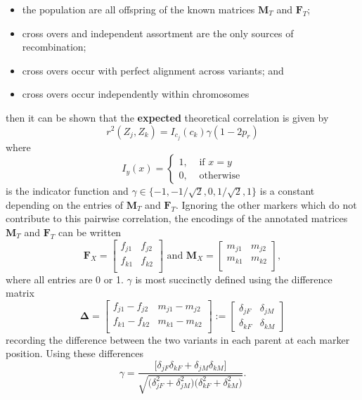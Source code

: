 \documentclass{article}
\newcommand{\m}[1]{\mathbf{#1}}               %
\newcommand{\sm}[1]{\boldsymbol{#1}}   %
\newcommand{\ind}[2]{I_{#2} \left( #1 \right)}
\newcommand{\corr}{r^2}
\begin{document}
\begin{itemize}
\item the population are all offspring of the known matrices $\m{M}_T$ and $\m{F}_T$;
\item cross overs and independent assortment are the only sources of recombination;
\item cross overs occur with perfect alignment across variants; and
\item cross overs occur independently within chromosomes
\end{itemize}
then it can be shown that the \textbf{expected} theoretical correlation is given by
\begin{equation} \label{eq:prGenCorr}
  \corr(Z_j, Z_k) = \ind{c_k}{c_j} \gamma ( 1 - 2p_r )
\end{equation}
where
\begin{equation*}\ind{x}{y} = \begin{cases}
  1, & \text{ if } x = y \\
  0, & \text{ otherwise}
\end{cases}
\end{equation*}
is the indicator function and $\gamma \in \{-1, -1/\sqrt{2}, 0, 1/\sqrt{2}, 1\}$ is a constant depending on the entries of $\m{M}_T$ and $\m{F}_T$. Ignoring the other markers which do not contribute to this pairwise correlation, the encodings of the annotated matrices $\m{M}_T$ and $\m{F}_T$ can be written
\begin{equation} \label{eq:encodedParents}
  \m{F}_X = \begin{bmatrix}
  f_{j1} & f_{j2} \\
  f_{k1} & f_{k2} \\
\end{bmatrix} \text{ and }
\m{M}_X = \begin{bmatrix}
  m_{j1} & m_{j2} \\
  m_{k1} & m_{k2} \\
\end{bmatrix},
\end{equation}
where all entries are 0 or 1. $\gamma$ is most succinctly defined using the difference matrix
\begin{equation} \label{eq:diffMatrix}
  \sm{\Delta} = \begin{bmatrix}
    f_{j1} - f_{j2} & m_{j1} - m_{j2} \\
    f_{k1} - f_{k2} & m_{k1} - m_{k2} \\
  \end{bmatrix} := \begin{bmatrix}
    \delta_{jF} & \delta_{jM} \\
    \delta_{kF} & \delta_{kM}
  \end{bmatrix}
\end{equation}
recording the difference between the two variants in each parent at each marker position. Using these differences
$$\gamma = \frac{ \Big [ \delta_{jF} \delta_{kF} + \delta_{jM} \delta_{kM} \Big ] }{  \sqrt{ \big ( \delta_{jF}^2 + \delta_{jM}^2 \big ) \big ( \delta_{kF}^2 + \delta_{kM}^2 \big )}}.$$
\end{document}
